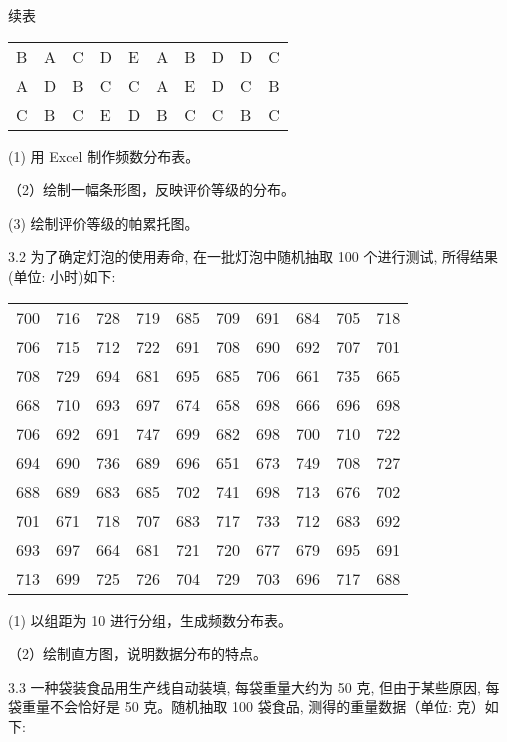 \documentclass[10pt]{article}
\begin{document}
\begin{CJK*}{UTF8}{bsmi}
续表

\begin{center}
\begin{tabular}{llllllllll}
\hline
B & A & C & D & E & A & B & D & D & C \\
A & D & B & C & C & A & E & D & C & B \\
C & B & C & E & D & B & C & C & B & C \\
\hline
\end{tabular}
\end{center}

(1) 用 Excel 制作频数分布表。

（2）绘制一幅条形图，反映评价等级的分布。

(3) 绘制评价等级的帕累托图。

3.2 为了确定灯泡的使用寿命, 在一批灯泡中随机抽取 100 个进行测试, 所得结果 (单位: 小时)如下:

\begin{center}
\begin{tabular}{llllllllll}
\hline
700 & 716 & 728 & 719 & 685 & 709 & 691 & 684 & 705 & 718 \\
706 & 715 & 712 & 722 & 691 & 708 & 690 & 692 & 707 & 701 \\
708 & 729 & 694 & 681 & 695 & 685 & 706 & 661 & 735 & 665 \\
668 & 710 & 693 & 697 & 674 & 658 & 698 & 666 & 696 & 698 \\
706 & 692 & 691 & 747 & 699 & 682 & 698 & 700 & 710 & 722 \\
694 & 690 & 736 & 689 & 696 & 651 & 673 & 749 & 708 & 727 \\
688 & 689 & 683 & 685 & 702 & 741 & 698 & 713 & 676 & 702 \\
701 & 671 & 718 & 707 & 683 & 717 & 733 & 712 & 683 & 692 \\
693 & 697 & 664 & 681 & 721 & 720 & 677 & 679 & 695 & 691 \\
713 & 699 & 725 & 726 & 704 & 729 & 703 & 696 & 717 & 688 \\
\hline
\end{tabular}
\end{center}

(1) 以组距为 10 进行分组，生成频数分布表。

（2）绘制直方图，说明数据分布的特点。

3.3 一种袋装食品用生产线自动装填, 每袋重量大约为 50 克, 但由于某些原因, 每袋重量不会恰好是 50 克。随机抽取 100 袋食品, 测得的重量数据（单位: 克）如下:


\end{CJK*}
\end{document}
